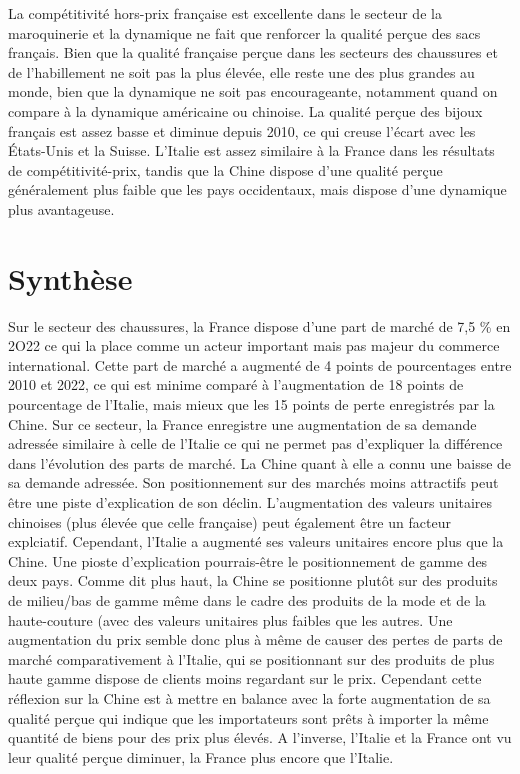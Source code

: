 \documentclass[french,10pt,a4paper]{article}
\begin{document}
La compétitivité hors-prix française est excellente dans le secteur de la maroquinerie et la dynamique ne fait que renforcer la qualité perçue des sacs français. Bien que la qualité française perçue dans les secteurs des chaussures et de l'habillement ne soit pas la plus élevée, elle reste une des plus grandes au monde, bien que la dynamique ne soit pas encourageante, notamment quand on compare à la dynamique américaine ou chinoise. La qualité perçue des bijoux français est assez basse et diminue depuis 2010, ce qui creuse l'écart avec les États-Unis et la Suisse. L'Italie est assez similaire à la France dans les résultats de compétitivité-prix, tandis que la Chine dispose d'une qualité perçue généralement plus faible que les pays occidentaux, mais dispose d'une dynamique plus avantageuse. 


\section{Synthèse}

Sur le secteur des chaussures, la France dispose d'une part de marché de 7,5 \% en 2O22 ce qui la place comme un acteur important mais pas majeur du commerce international. Cette part de marché a augmenté de 4 points de pourcentages entre 2010 et 2022, ce qui est minime comparé à l'augmentation de 18 points de pourcentage de l'Italie, mais mieux que les 15 points de perte enregistrés par la Chine. Sur ce secteur, la France enregistre une augmentation de sa demande adressée similaire à celle de l'Italie ce qui ne permet pas d'expliquer la différence dans l'évolution des parts de marché. La Chine quant à elle a connu une baisse de sa demande adressée. Son positionnement sur des marchés moins attractifs peut être une piste d'explication de son déclin. L'augmentation des valeurs unitaires chinoises (plus élevée que celle française) peut également être un facteur explciatif. Cependant, l'Italie a augmenté ses valeurs unitaires encore plus que la Chine. Une pioste d'explication pourrais-être le positionnement de gamme des deux pays. Comme dit plus haut, la Chine se positionne plutôt sur des produits de milieu/bas de gamme même dans le cadre des produits de la mode et de la haute-couture (avec des valeurs unitaires plus faibles que les autres. Une augmentation du prix semble donc plus à même de causer des pertes de parts de marché comparativement à l'Italie, qui se positionnant sur des produits de plus haute gamme dispose de clients moins regardant sur le prix. Cependant cette réflexion sur la Chine est à mettre en balance avec la forte augmentation de sa qualité perçue qui indique que les importateurs sont prêts à importer la même quantité de biens pour des prix plus élevés. A l'inverse, l'Italie et la France ont vu leur qualité perçue diminuer, la France plus encore que l'Italie.
\end{document}
